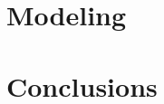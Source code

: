 \documentclass[11pt,a4paper]{article}
\begin{document}
	
	\section{Modeling}
	\label{sec:modeling}
	
	
	\section{Conclusions}
	\label{sec:conc}
	
	
	
	
	
\end{document}
